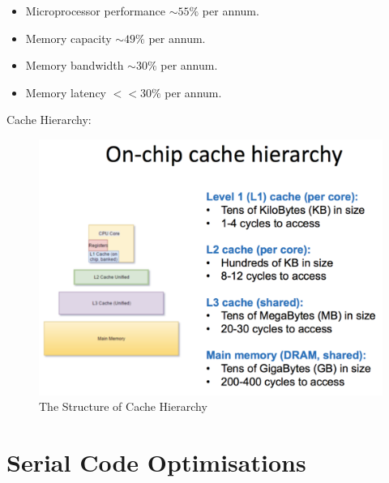 \documentclass{article}
\begin{document}
\begin{itemize}
    \item Microprocessor performance $\sim55\%$ per annum.
    \item Memory capacity $\sim49\%$ per annum.
    \item Memory bandwidth $\sim30\%$ per annum.
    \item Memory latency $<< 30\%$ per annum.
\end{itemize}


Cache Hierarchy:

\begin{figure}[h]
    \centering
    \includegraphics[scale=0.3]{images/cache-hierarchy.png}
    \caption{The Structure of Cache Hierarchy}
    \label{fig:my_label}
\end{figure}


\section{Serial Code Optimisations}
\end{document}

